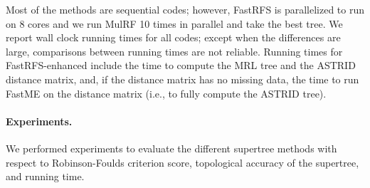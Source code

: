 Most of the methods are sequential codes; however, FastRFS is
parallelized to run on 8 cores and we run MulRF 10 times in parallel
and take the best tree.  We report wall clock running times for all
codes; except when the differences are large, comparisons between
running times are not reliable. Running times for FastRFS-enhanced
include the time to compute the MRL tree
and the ASTRID distance matrix, and, if the 
distance matrix has no missing data,   the time to run
FastME on the distance matrix (i.e., to fully compute the
ASTRID tree).

\paragraph{\bf Experiments.  }
We performed  experiments to evaluate the 
different supertree methods with respect to  
Robinson-Foulds criterion score,  topological accuracy of the supertree, and  
running time. 

